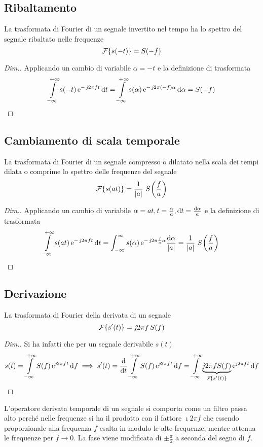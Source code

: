 \subsection{Ribaltamento}
La trasformata di Fourier di un segnale invertito nel tempo ha lo spettro del segnale ribaltato nelle frequenze
\begin{equation}
	\operatorname{\mathcal{F}}\!\left\lbrace{s(-t)}\right\rbrace=S(-f)
\end{equation}
\begin{proof}[Dim.]
Applicando un cambio di variabile $\alpha=-t$ e la definizione di trasformata
\[
	\int\limits_{-\infty}^{+\infty}{s(-t)\operatorname{e}^{-\operatorname{\mathit{j}\!} 2\pi f t}}{\,\mathop{}\!\mathrm{d}{t}}=
	\int\limits_{-\infty}^{+\infty}{s(\alpha)\operatorname{e}^{-\operatorname{\mathit{j}\!} 2\pi (-f)\alpha}}{\,\mathop{}\!\mathrm{d}{\alpha}}=S(-f)
\qedhere
\]
\end{proof}

\subsection{Cambiamento di scala temporale}
La trasformata di Fourier di un segnale compresso o dilatato nella scala dei tempi dilata o comprime lo spettro delle frequenze del segnale
\begin{equation}
\label{eq:trasf_Fourier_scala}
	\operatorname{\mathcal{F}}\!\left\lbrace{s(a t)}\right\rbrace=\frac{1}{\left|{a}\right|}\,\,{S}^{}\!\left({\frac{f}{a}}\right)
\end{equation}
\begin{proof}[Dim.]
Applicando un cambio di variabile $\alpha=a t, t=\frac{\alpha}{a}, \mathop{}\!\mathrm{d} t=\frac{\mathop{}\!\mathrm{d}\alpha}{a}$ e la definizione di trasformata
\[
	\int\limits_{-\infty}^{+\infty}{s(a t)\operatorname{e}^{-\operatorname{\mathit{j}\!} 2\pi f t}}{\,\mathop{}\!\mathrm{d}{t}}=
	\int_{-\infty}^{\infty}{s(\alpha)\operatorname{e}^{-\operatorname{\mathit{j}\!} 2\pi\frac{f}{a}\alpha}}{\frac{\mathop{}\!\mathrm{d}\alpha}{\left|{a}\right|}}=\frac{1}{\left|{a}\right|}\,\,{S}^{}\!\left({\frac{f}{a}}\right)
\qedhere
\]
\end{proof}

\subsection{Derivazione}
La trasformata di Fourier della derivata di un segnale
\begin{equation}
	\operatorname{\mathcal{F}}\!\left\lbrace{s'(t)}\right\rbrace=\operatorname{\mathit{j}\!} 2\pi f\,S(f)
\end{equation}
\begin{proof}[Dim.]
Si ha infatti che per un segnale derivabile $s(t)$
\[
	s(t)=\intinf{S(f)\e{\imath 2\pi f t}}{f}\implies s'(t)=\deriv{}{t}\intinf{S(f)\e{\imath 2\pi f t}}{f}=
\intinf{ \underbrace{\imath 2\pi f S(f)}_{\fourier{s'(t)}}\e{\imath 2\pi f t}}{f}
\qedhere
\]
\end{proof}

\begin{nota}
	L'operatore derivata temporale di un segnale si comporta come un filtro passa alto perché nelle frequenze si ha il prodotto con il fattore $\imath 2\pi f$ che essendo proporzionale alla frequenza $f$ esalta in modulo le alte frequenze, mentre attenua le frequenze per $f\to 0$. La fase viene modificata di $\pm\frac{\pi}{2}$ a seconda del segno di $f$.
\end{nota}

